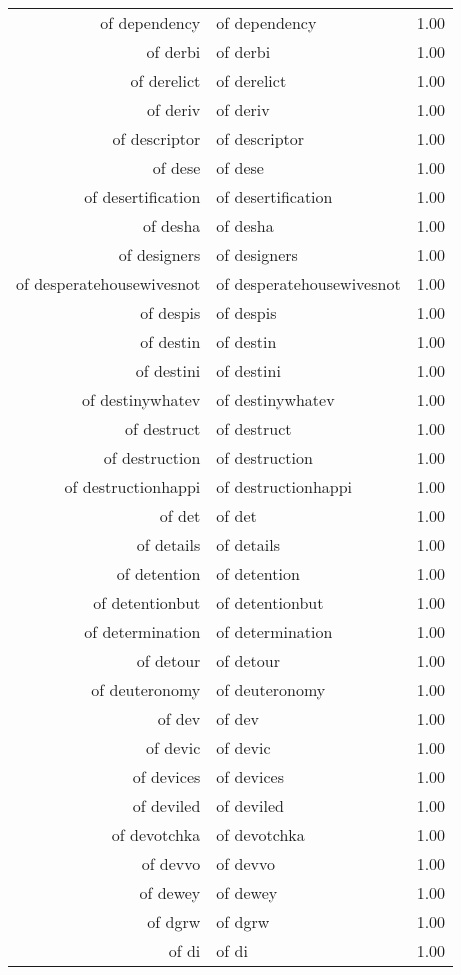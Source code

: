 \begin{table}[ht]
\begin{tabular}{rlr}
  of dependency & of dependency & 1.00 \\ 
  of derbi & of derbi & 1.00 \\ 
  of derelict & of derelict & 1.00 \\ 
  of deriv & of deriv & 1.00 \\ 
  of descriptor & of descriptor & 1.00 \\ 
  of dese & of dese & 1.00 \\ 
  of desertification & of desertification & 1.00 \\ 
  of desha & of desha & 1.00 \\ 
  of designers & of designers & 1.00 \\ 
  of desperatehousewivesnot & of desperatehousewivesnot & 1.00 \\ 
  of despis & of despis & 1.00 \\ 
  of destin & of destin & 1.00 \\ 
  of destini & of destini & 1.00 \\ 
  of destinywhatev & of destinywhatev & 1.00 \\ 
  of destruct & of destruct & 1.00 \\ 
  of destruction & of destruction & 1.00 \\ 
  of destructionhappi & of destructionhappi & 1.00 \\ 
  of det & of det & 1.00 \\ 
  of details & of details & 1.00 \\ 
  of detention & of detention & 1.00 \\ 
  of detentionbut & of detentionbut & 1.00 \\ 
  of determination & of determination & 1.00 \\ 
  of detour & of detour & 1.00 \\ 
  of deuteronomy & of deuteronomy & 1.00 \\ 
  of dev & of dev & 1.00 \\ 
  of devic & of devic & 1.00 \\ 
  of devices & of devices & 1.00 \\ 
  of deviled & of deviled & 1.00 \\ 
  of devotchka & of devotchka & 1.00 \\ 
  of devvo & of devvo & 1.00 \\ 
  of dewey & of dewey & 1.00 \\ 
  of dgrw & of dgrw & 1.00 \\ 
  of di & of di & 1.00 \\ 

\end{tabular}
\end{table}
